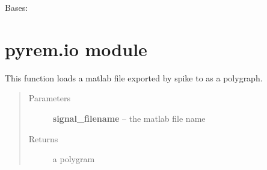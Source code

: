 \documentclass[letterpaper,10pt,english]{sphinxmanual}
\begin{document}
\begin{fulllineitems}
\label{pyrem.feature_families:pyrem.feature_families.VigilState}
Bases: {\hyperref[pyrem.feature_families:pyrem.feature_families.AnnotationFeatureBase]{}}

\begin{fulllineitems}
\label{pyrem.feature_families:pyrem.feature_families.VigilState.prefix}
\end{fulllineitems}


\end{fulllineitems}



\section{pyrem.io module}
\label{pyrem.io:module-pyrem.io}\label{pyrem.io:pyrem-io-module}\label{pyrem.io::doc}

\begin{fulllineitems}
\label{pyrem.io:pyrem.io.polygram_from_pkl}
\end{fulllineitems}


\begin{fulllineitems}
\label{pyrem.io:pyrem.io.polygram_from_spike_matlab_file}
This function loads a matlab file exported by spike to
as a polygraph.
\begin{quote}\begin{description}
\item[{Parameters}] \leavevmode
\textbf{signal\_filename} -- the matlab file name

\item[{Returns}] \leavevmode
a polygram

\end{description}\end{quote}

\end{fulllineitems}
\end{document}
